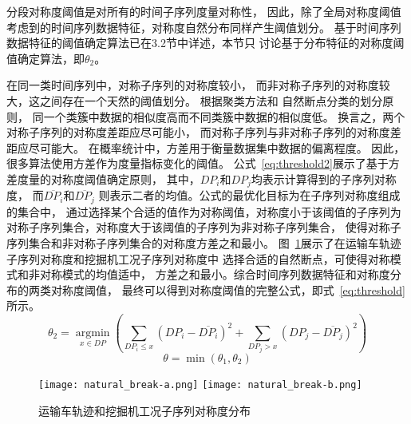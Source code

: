 分段对称度阈值是对所有的时间子序列度量对称性，
因此，除了全局对称度阈值
考虑到的时间序列数据特征，对称度自然分布同样产生阈值划分。
基于时间序列数据特征的阈值确定算法已在3.2节中详述，本节只
讨论基于分布特征的对称度阈值确定算法，即$\theta_2$。

在同一类时间序列中，对称子序列的对称度较小，
而非对称子序列的对称度较大，这之间存在一个天然的阈值划分\cite{2022968}。
根据聚类方法\cite{DBLP:conf/kdd/EsterKSX96}和
自然断点分类的划分原则\cite{DBLP:journals/pami/Cheng95}，
同一个类簇中数据的相似度高而不同类簇中数据的相似度低。
换言之，两个对称子序列的对称度差距应尽可能小，
而对称子序列与非对称子序列的对称度差距应尽可能大。
在概率统计中，方差用于衡量数据集中数据的偏离程度。
因此，很多算法使用方差作为度量指标变化的阈值\cite{DBLP:conf/sigmod/SongZW16}。
公式~\ref{eq:threshold2}展示了基于方差度量的对称度阈值确定原则，
其中，$DP_i$和$DP_j$均表示计算得到的子序列对称度，
而$\overline{DP_{i}}$和$\overline{DP_{j}}$
则表示二者的均值。公式的最优化目标为在子序列对称度组成的集合中，
通过选择某个合适的值作为对称阈值，对称度小于该阈值的子序列为
对称子序列集合，对称度大于该阈值的子序列为非对称子序列集合，
使得对称子序列集合和非对称子序列集合的对称度方差之和最小。
图~\ref{fig:natural_break}展示了在运输车轨迹子序列对称度和挖掘机工况子序列对称度中
选择合适的自然断点，可使得对称模式和非对称模式的均值适中，
方差之和最小。综合时间序列数据特征和对称度分布的两类对称度阈值，
最终可以得到对称度阈值的完整公式，即式~\ref{eq:threshold}所示。
\begin{equation}
  \theta_{2}=\underset{x \in D P}{\operatorname{argmin}}\left(\sum_{D P_{i} \leq x}\left(D P_{i}-\overline{D P_{i}}\right)^{2}+\sum_{D P_{j}>x}\left(D P_{j}-\overline{D P_{j}}\right)^{2}\right)
  \label{eq:threshold2}
\end{equation}
\begin{equation}
  \theta=\min \left(\theta_{1}, \theta_{2}\right)
  \label{eq:threshold}
\end{equation}
\begin{figure}
  \centering
  {\texttt{[image: natural\_break-a.png]}}
  {\texttt{[image: natural\_break-b.png]}}
  \caption{运输车轨迹和挖掘机工况子序列对称度分布}
  \label{fig:natural_break}
\end{figure}

\renewcommand{\algorithmicrequire}{\textbf{输入：}\unskip}
\renewcommand{\algorithmicensure}{\textbf{输出：}\unskip}

